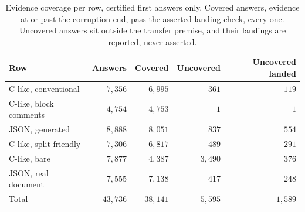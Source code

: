 \documentclass[11pt,a4paper]{article}
\theoremstyle{definition}
\theoremstyle{plain}
\theoremstyle{remark}
\begin{document}
\begin{table}[tbp]
\centering
\small
\setlength{\tabcolsep}{5pt}
\renewcommand{\arraystretch}{1.15}
\begin{tabular}{lrrrr}
\toprule
Row & Answers & Covered & Uncovered & Uncovered landed \\
\midrule
C-like, conventional & $7{,}356$ & $6{,}995$ & $361$ & $119$ \\
C-like, block comments & $4{,}754$ & $4{,}753$ & $1$ & $1$ \\
JSON, generated & $8{,}888$ & $8{,}051$ & $837$ & $554$ \\
C-like, split-friendly & $7{,}306$ & $6{,}817$ & $489$ & $291$ \\
C-like, bare & $7{,}877$ & $4{,}387$ & $3{,}490$ & $376$ \\
JSON, real document & $7{,}555$ & $7{,}138$ & $417$ & $248$ \\
\midrule
Total & $43{,}736$ & $38{,}141$ & $5{,}595$ & $1{,}589$ \\
\bottomrule
\end{tabular}
\renewcommand{\arraystretch}{1.0}
\caption{Evidence coverage per row, certified first answers only. Covered answers, evidence at or past the corruption
end, pass the asserted landing check, every one. Uncovered answers sit outside the transfer premise, and their landings
are reported, never asserted.}
\label{tab:coverage}
\end{table}
\end{document}
